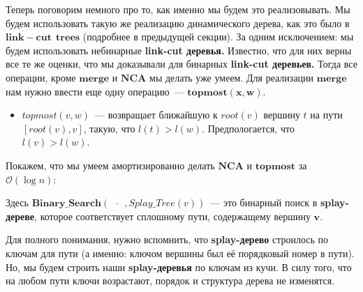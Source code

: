     Теперь поговорим немного про то, как именно мы будем это реализовывать. Мы будем использовать такую же реализацию динамического дерева, как это было в $\mathbf{link-cut\:\:trees}$ (подробнее в предыдущей секции). За одним исключением: мы будем использовать небинарные \textbf{link-cut деревья.} Известно, что для них верны все те же оценки, что мы доказывали для бинарных \textbf{link-cut деревьев.} Тогда все операции, кроме $\mathbf{merge}$ и $\mathbf{NCA}$ мы делать уже умеем. Для реализации $\mathbf{merge}$ нам нужно ввести еще одну операцию~--- $\mathbf{topmost(x, w)}.$
    \begin{itemize}
        \item $topmost(v, w)$~--- возвращает ближайшую к $root(v)$ вершину $t$ на пути $[root(v), v]$, такую, что $l(t) > l(w).$ Предпологается, что $l(v) > l(w).$
    \end{itemize}
    
    Покажем, что мы умеем амортизированно делать $\mathbf{NCA}$ и $\mathbf{topmost}$ за $\mathcal{O}(\log{n}):$
    \begin{algorithmic}[1]
        \State{}
    \EndProcedure
    \end{algorithmic}
    \begin{algorithmic}[1]
        \State{}
    \EndProcedure
    \end{algorithmic}
    
    Здесь $\mathbf{Binary\_Search}(\:\:\cdot\:\:,Splay\_Tree(v))$~--- это бинарный поиск в \textbf{splay-дереве}, которое соответствует сплошному пути, содержащему вершину $\mathbf{v}.$ 
    
    Для полного понимания, нужно вспомнить, что \textbf{splay-дерево} строилось по \guillemotright$\:\:$ ключам для пути (а именно: ключом вершины был её порядковый номер в пути). Но, мы будем строить наши \textbf{splay-деревья} по ключам из кучи. В силу того, что на любом пути ключи возрастают, порядок и структура дерева не изменятся.
    
